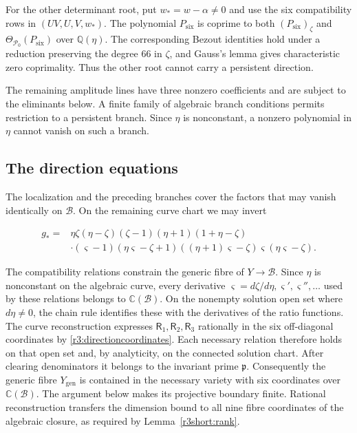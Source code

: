 \documentclass[11pt,a4paper]{article}
\numberwithin{equation}{section}
\theoremstyle{plain}
\theoremstyle{definition}
\theoremstyle{remark}
\begin{document}
For the other determinant root, put $w_*=w-\alpha\ne0$ and use the
six compatibility rows in $(UV,U,V,w_*)$.
The polynomial $P_{\mathrm{six}}$ is coprime to both $(P_{\mathrm{six}})_\zeta$ and $\Theta_{\mathcal P_0}(P_{\mathrm{six}})$
over $\mathbb Q(\eta)$.
The corresponding Bezout identities hold under a reduction preserving
the degree $66$ in $\zeta$, and Gauss's lemma gives characteristic zero
coprimality. Thus the other root cannot carry a persistent direction.

The remaining amplitude lines have three nonzero coefficients and are
subject to the eliminants below.
A finite family of algebraic branch conditions permits restriction to
a persistent branch. Since $\eta$ is nonconstant, a nonzero polynomial
in $\eta$ cannot vanish on such a branch.

\subsection{The direction equations}
\label{appr3:moments}

The localization and the preceding branches cover the
factors that may vanish identically on $\mathscr B$. On the remaining curve chart we may invert

\begin{equation}
\begin{aligned}
g_*={}&\eta \zeta (\eta -\zeta )(\zeta -1)(\eta +1)(1+\eta -\zeta )\\
 &\cdot(\varsigma -1)(\eta \varsigma -\zeta +1)((\eta +1)\varsigma -\zeta )\varsigma (\eta \varsigma -\zeta ).
\end{aligned}
\end{equation}

The compatibility relations constrain the generic fibre of
$Y\to\mathscr B$. Since $\eta $ is
nonconstant on the algebraic curve, every derivative
$\varsigma =d\zeta /d\eta ,\varsigma ',\varsigma '',\ldots$ used by these relations belongs to
$\mathbb C(\mathscr B)$. On the nonempty solution open set where $d\eta \ne0$,
the chain rule identifies these with the derivatives of the ratio functions.
The curve reconstruction expresses $\mathsf R_1,\mathsf R_2,\mathsf R_3$ rationally in the
six off-diagonal coordinates by \eqref{r3:directioncoordinates}.
Each necessary relation therefore holds on that open
set and, by analyticity, on the connected solution chart. After
clearing denominators it belongs to the invariant prime
$\mathfrak p$. Consequently the generic fibre $Y_{\mathrm{gen}}$ is contained
in the necessary variety with six coordinates over $\mathbb C(\mathscr B)$.
The argument below makes its projective boundary finite. Rational
reconstruction transfers the dimension bound to all nine fibre
coordinates of the algebraic closure, as required by
Lemma~\ref{r3short:rank}.
\end{document}
